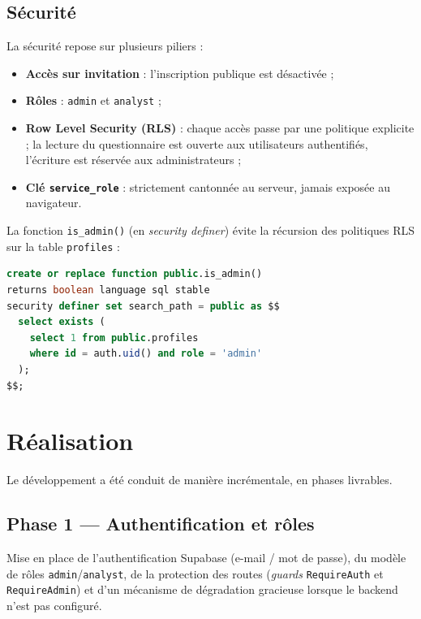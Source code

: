 \documentclass[11pt,a4paper]{report}
\begin{document}
\section{Sécurité}
La sécurité repose sur plusieurs piliers :
\begin{itemize}[noitemsep]
  \item \textbf{Accès sur invitation} : l'inscription publique est désactivée ;
  \item \textbf{Rôles} : \texttt{admin} et \texttt{analyst} ;
  \item \textbf{Row Level Security (RLS)} : chaque accès passe par une politique
  explicite ; la lecture du questionnaire est ouverte aux utilisateurs
  authentifiés, l'écriture est réservée aux administrateurs ;
  \item \textbf{Clé \texttt{service\_role}} : strictement cantonnée au serveur,
  jamais exposée au navigateur.
\end{itemize}

La fonction \texttt{is\_admin()} (en \emph{security definer}) évite la récursion
des politiques RLS sur la table \texttt{profiles} :

\begin{lstlisting}[language=SQL, caption={Fonction de vérification du rôle administrateur.}]
create or replace function public.is_admin()
returns boolean language sql stable
security definer set search_path = public as $$
  select exists (
    select 1 from public.profiles
    where id = auth.uid() and role = 'admin'
  );
$$;
\end{lstlisting}

\chapter{Réalisation}

Le développement a été conduit de manière incrémentale, en phases livrables.

\section{Phase 1 — Authentification et rôles}
Mise en place de l'authentification Supabase (e-mail / mot de passe), du modèle
de rôles \texttt{admin}/\texttt{analyst}, de la protection des routes
(\emph{guards} \texttt{RequireAuth} et \texttt{RequireAdmin}) et d'un mécanisme
de dégradation gracieuse lorsque le backend n'est pas configuré.
\end{document}
